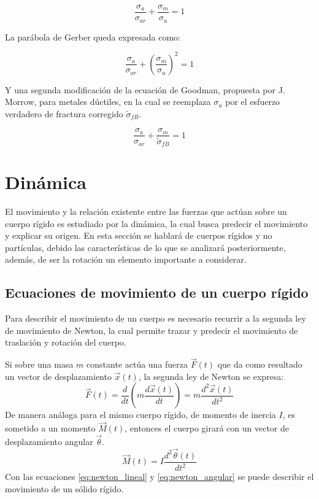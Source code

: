 \begin{equation} \label{eq:good_norm}
	\frac{\sigma_a}{\sigma_{ar}} + \frac{\sigma_m}{\sigma_u} = 1 
\end{equation}

La parábola de Gerber queda expresada como:

\begin{equation} \label{eq:par_gerber}
	\frac{\sigma_a}{\sigma_{ar}} + \left(\frac{\sigma_m}{\sigma_u}\right)^2 = 1 
\end{equation}

Y una segunda modificación de la ecuación de Goodman, propuesta por J. Morrow, para metales dúctiles, en la cual se reemplaza $\sigma_u$ por el esfuerzo verdadero de fractura corregido $\tilde{\sigma}_{fB}$.

\begin{equation} \label{eq:mod_goodduct}
	\frac{\sigma_a}{\sigma_{ar}} + \frac{\sigma_m}{\tilde{\sigma}_{fB}} = 1 
\end{equation}

\section{Dinámica}

El movimiento y la relación existente entre las fuerzas que actúan sobre un cuerpo rígido es estudiado por la dinámica, la cual busca predecir el movimiento y explicar su origen. En esta sección se hablará de cuerpos rígidos y no partículas, debido las características de lo que se analizará posteriormente, además, de ser la rotación un elemento importante a considerar. 
\subsection{Ecuaciones de movimiento de un cuerpo rígido}
\label{sec:ec_mov}
Para describir el movimiento de un cuerpo es necesario recurrir a la segunda ley de movimiento de Newton, la cual permite trazar y predecir el movimiento de traslación y rotación del cuerpo.

Si sobre una masa $m$ constante actúa una fuerza $\vec{F}(t)$ que da como resultado un vector de desplazamiento $\vec{x}(t)$, la segunda ley de Newton se expresa:
\begin{equation}\label{eq:newton_lineal}
	\vec{F}(t) = \frac{d}{dt}\left(m\frac{d\vec{x}(t)}{dt}\right) = m \frac{d^2\vec{x}(t)}{dt^2}
\end{equation}
De manera análoga para el mismo cuerpo rígido, de momento de inercia $I$, es sometido a un momento $\vec{M}(t)$, entonces el cuerpo girará con un vector de desplazamiento angular $\vec{\theta}$.
\begin{equation}\label{eq:newton_angular}
	\vec{M}(t) = I\frac{d^2\vec{\theta}(t)}{dt^2}
\end{equation} 
Con las ecuaciones \ref{eq:newton_lineal} y \ref{eq:newton_angular} se puede describir el movimiento de un sólido rígido.

